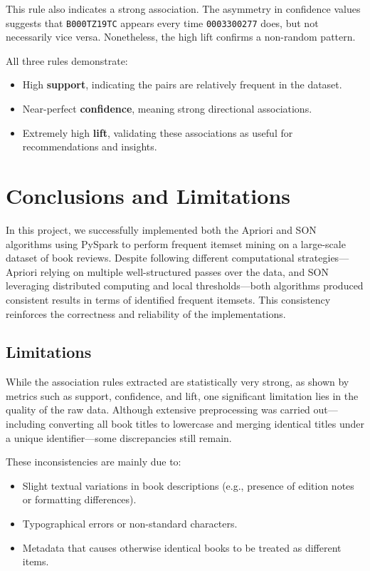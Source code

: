 \documentclass[a4paper,12pt]{article}
\begin{document}
This rule also indicates a strong association. The asymmetry in confidence values suggests that \texttt{B000TZ19TC} appears every time \texttt{0003300277} does, but not necessarily vice versa. Nonetheless, the high lift confirms a non-random pattern.

\vspace{0.3cm}
All three rules demonstrate:
\begin{itemize}
    \item High \textbf{support}, indicating the pairs are relatively frequent in the dataset.
    \item Near-perfect \textbf{confidence}, meaning strong directional associations.
    \item Extremely high \textbf{lift}, validating these associations as useful for recommendations and insights.
\end{itemize}

\newpage
\section{Conclusions and Limitations}


In this project, we successfully implemented both the Apriori and SON algorithms using PySpark to perform frequent itemset mining on a large-scale dataset of book reviews. Despite following different computational strategies—Apriori relying on multiple well-structured passes over the data, and SON leveraging distributed computing and local thresholds—both algorithms produced consistent results in terms of identified frequent itemsets. This consistency reinforces the correctness and reliability of the implementations.

\subsection{Limitations}

While the association rules extracted are statistically very strong, as shown by metrics such as support, confidence, and lift, one significant limitation lies in the quality of the raw data. Although extensive preprocessing was carried out—including converting all book titles to lowercase and merging identical titles under a unique identifier—some discrepancies still remain.

These inconsistencies are mainly due to:
\begin{itemize}
    \item Slight textual variations in book descriptions (e.g., presence of edition notes or formatting differences).
    \item Typographical errors or non-standard characters.
    \item Metadata that causes otherwise identical books to be treated as different items.
\end{itemize}
\end{document}

